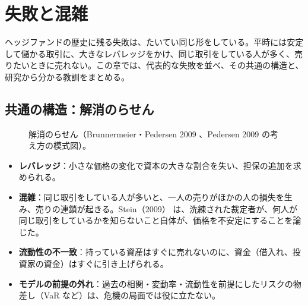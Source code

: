\chapter{失敗と混雑}
\label{ch:failures}

ヘッジファンドの歴史に残る失敗は、たいてい同じ形をしている。平時には安定して儲かる取引に、大きなレバレッジをかけ、同じ取引をしている人が多く、売りたいときに売れない。この章では、代表的な失敗を並べ、その共通の構造と、研究から分かる教訓をまとめる。

\section{共通の構造：解消のらせん}

\begin{figure}[H]
\centering
{}
\caption{解消のらせん（Brunnermeier・Pedersen 2009 \cite{brunnermeierpedersen2009}、Pedersen 2009 \cite{pedersen2009} の考え方の模式図）。}
\label{fig:spiral}
\end{figure}

\begin{itemize}
\item \textbf{レバレッジ}：小さな価格の変化で資本の大きな割合を失い、担保の追加を求められる。
\item \textbf{混雑}：同じ取引をしている人が多いと、一人の売りがほかの人の損失を生み、売りの連鎖が起きる。Stein（2009）\cite{stein2009} は、洗練された裁定者が、何人が同じ取引をしているかを知らないこと自体が、価格を不安定にすることを論じた。
\item \textbf{流動性の不一致}：持っている資産はすぐに売れないのに、資金（借入れ、投資家の資金）はすぐに引き上げられる。
\item \textbf{モデルの前提の外れ}：過去の相関・変動率・流動性を前提にしたリスクの物差し（VaR など）は、危機の局面では役に立たない。
\end{itemize}

